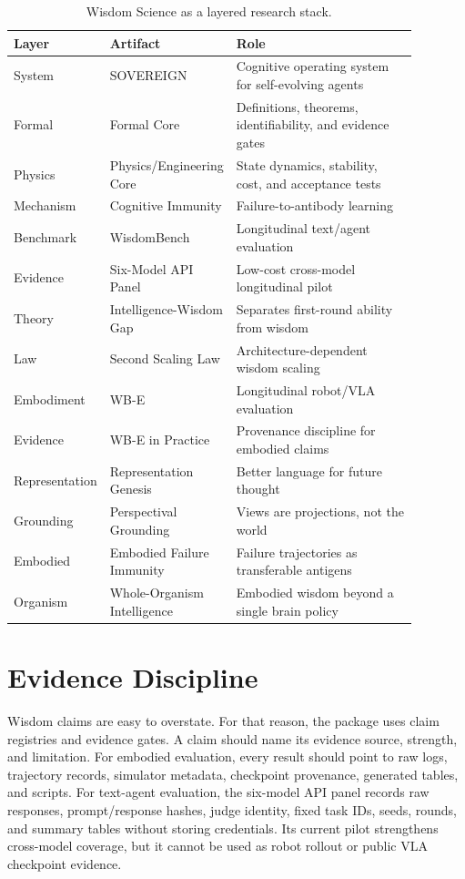 \documentclass[11pt]{article}
\begin{document}
\begin{table}[h]
\centering
\scriptsize
\setlength{\tabcolsep}{4pt}
\begin{tabular}{p{0.13\linewidth}p{0.23\linewidth}p{0.52\linewidth}}
\toprule
Layer & Artifact & Role \\
\midrule
System & SOVEREIGN & Cognitive operating system for self-evolving agents \\
Formal & Formal Core & Definitions, theorems, identifiability, and evidence gates \\
Physics & Physics/Engineering Core & State dynamics, stability, cost, and acceptance tests \\
Mechanism & Cognitive Immunity & Failure-to-antibody learning \\
Benchmark & WisdomBench & Longitudinal text/agent evaluation \\
Evidence & Six-Model API Panel & Low-cost cross-model longitudinal pilot \\
Theory & Intelligence-Wisdom Gap & Separates first-round ability from wisdom \\
Law & Second Scaling Law & Architecture-dependent wisdom scaling \\
Embodiment & WB-E & Longitudinal robot/VLA evaluation \\
Evidence & WB-E in Practice & Provenance discipline for embodied claims \\
Representation & Representation Genesis & Better language for future thought \\
Grounding & Perspectival Grounding & Views are projections, not the world \\
Embodied & Embodied Failure Immunity & Failure trajectories as transferable antigens \\
Organism & Whole-Organism Intelligence & Embodied wisdom beyond a single brain policy \\
\bottomrule
\end{tabular}
\caption{Wisdom Science as a layered research stack.}
\label{tab:stack}
\end{table}

\section{Evidence Discipline}

Wisdom claims are easy to overstate.
For that reason, the package uses claim registries and evidence gates.
A claim should name its evidence source, strength, and limitation.
For embodied evaluation, every result should point to raw logs, trajectory records, simulator metadata, checkpoint provenance, generated tables, and scripts.
For text-agent evaluation, the six-model API panel records raw responses, prompt/response hashes, judge identity, fixed task IDs, seeds, rounds, and summary tables without storing credentials.
Its current pilot strengthens cross-model coverage, but it cannot be used as robot rollout or public VLA checkpoint evidence.
\end{document}
